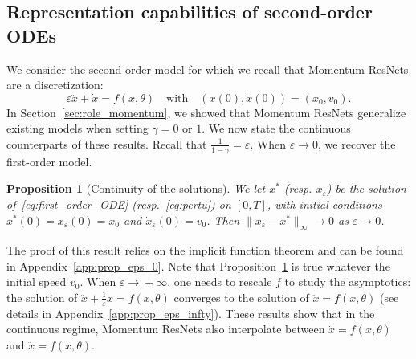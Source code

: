 \documentclass{article}
\newtheorem{proposition}{Proposition}
\begin{document}
\subsection{Representation capabilities of second-order ODEs}
We consider the second-order model for which we recall that Momentum ResNets are a discretization: 
\begin{equation}\label{eq:pertu}
\varepsilon \ddot{x} + \dot{x} = f(x,\theta)
\quad\text{with}\quad
(x(0),\dot{x}(0)) = (x_0,v_0).
\end{equation}
In Section~\ref{sec:role_momentum}, we showed that Momentum ResNets generalize existing models when setting $\gamma = 0$ or $1$. We now state the continuous counterparts of these results.
Recall that $\frac{1}{1-\gamma} = \varepsilon$. When $\varepsilon \xrightarrow{} 0$, we recover the first-order model.
\begin{proposition}[Continuity of the solutions]\label{prop:eps_0}We let $x^*$ (resp. $x_{\varepsilon}$) be the solution of~\eqref{eq:first_order_ODE} (resp.~\eqref{eq:pertu}) on $[0,T]$, with initial conditions $x^*(0) = x_{\varepsilon}(0)=x_0$ and $\dot{x}_{\varepsilon}(0) = v_0$.
Then  $\|x_{\varepsilon} - x^* \|_{\infty} \xrightarrow[]{} 0$ as $\varepsilon \xrightarrow{} 0$.
\end{proposition} 
The proof of this result relies on the implicit function theorem and can be found in Appendix~\ref{app:prop_eps_0}.
Note that Proposition~\ref{prop:eps_0} is true whatever the initial speed $v_0$. 
When $\varepsilon \xrightarrow{} +\infty$, one needs to rescale $f$ to study the asymptotics: the solution of $\ddot{x} + \frac{1}{\varepsilon} \dot{x} = f(x,\theta)$ converges to the solution of $\ddot{x} = f(x,\theta)$ (see details in Appendix~\ref{app:prop_eps_infty}).
 These results show that in the continuous regime, Momentum ResNets also interpolate between $\dot{x} = f(x,\theta)$ and $\ddot{x} = f(x,\theta)$.
\end{document}
